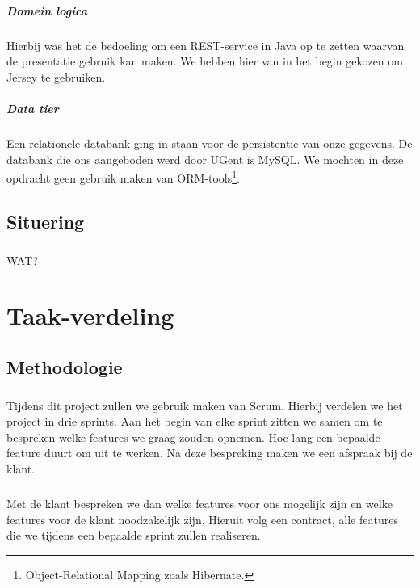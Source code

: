 \documentclass[pdftex,a4paper,12pt,twoside]{report}
\begin{document}
\paragraph{Domein logica}
Hierbij was het de bedoeling om een REST-service in Java op te zetten waarvan de presentatie gebruik kan maken. We hebben hier van in het begin gekozen om Jersey te gebruiken.

\paragraph{Data tier}
Een relationele databank ging in staan voor de persistentie van onze gegevens. De databank die ons aangeboden werd door UGent is MySQL. We mochten in deze opdracht geen gebruik maken van ORM-tools\footnote{Object-Relational Mapping zoals Hibernate.}. 

\section{Situering}
\paragraph{}
WAT?

\chapter{Taak-verdeling}

\section{Methodologie}
\paragraph{}
Tijdens dit project zullen we gebruik maken van Scrum. Hierbij verdelen we het project in drie sprints. Aan het begin van elke sprint zitten we samen om te bespreken welke features we graag zouden opnemen. Hoe lang een bepaalde feature duurt om uit te werken. Na deze bespreking maken we een afspraak bij de klant.

\paragraph{}
Met de klant bespreken we dan welke features voor ons mogelijk zijn en welke features voor de klant noodzakelijk zijn. Hieruit volg een contract, alle features die we tijdens een bepaalde sprint zullen realiseren.
\end{document}
